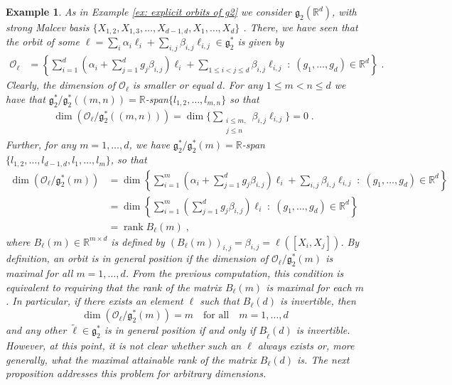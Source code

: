 \documentclass[pdflatex,sn-mathphys-num]{sn-jnl}
\theoremstyle{thmstyletwo}
\theoremstyle{thmstyleone}
\theoremstyle{thmstyletwo}
\newtheorem{example}[definition]{Example}
\newcommand{\fancyg}{\mathfrak{g}}
\newcommand{\R}{\mathbb{R}}
\begin{document}
	\begin{example}\label{ex: general orbits of g2 pt1}
		As in Example \ref{ex: explicit orbits of g2} we consider $\fancyg_2(\R^d)$, with strong Malcev basis $\{X_{1,2}, X_{1,3}, \ldots, X_{d-1,d},X_1, \ldots, X_d\}$ . There, we have seen that the orbit of some $\ell = \sum_i \alpha_i \ell_i + \sum_{i,j} \beta_{i,j} \ell_{i,j} \in \fancyg_2^*$ is given by
		\begin{align*}
			\mathcal{O}_\ell &= \left\{\sum_{i=1}^d(\alpha_i+\sum_{j=1}^dg_{j}\beta_{i,j})\ell_i+\sum_{1\leq i<j\leq d}\beta_{i,j}\ell_{i,j} \;:\; (g_{1}, \ldots, g_d) \in \mathbb{R}^d\right\} \;.
		\end{align*}
		Clearly, the dimension of $\mathcal{O}_\ell$ is smaller or equal $d$. For any $1 \leq m<n\leq d$ we have that $\fancyg_2^*/\fancyg_{2}^*((m, n)) = \R$-span$\{l_{1,2}, \ldots,l_{m,n}\}$ so that
		\begin{align*}
			\dim\left(\mathcal{O}_\ell/\fancyg_{2}^*((m, n))\right)= \dim\Big\{\sum_{\substack{i\leq m,\\j\leq n}}\beta_{i,j}\ell_{i,j}\Big\} = 0 \;. \;
		\end{align*}
		Further, for any $m = 1, \ldots, d$, we have $\fancyg_2^*/\fancyg_{2}^*(m) = \R$-span$\{l_{1,2}, \ldots,l_{d-1,d}, l_1, \ldots, l_m\}$, so that
		\begin{align*}
			\dim\left(\mathcal{O}_\ell/\fancyg_{2}^*(m)\right)&= \dim\left\{\sum_{i=1}^m(\alpha_i+\sum_{j=1}^dg_{j}\beta_{i,j})\ell_i+\sum_{i,j}\beta_{i,j}\ell_{i,j} \;:\; (g_{1}, \ldots, g_d) \in \mathbb{R}^d\right\}\\
			&=\dim\left\{\sum_{i=1}^m\left(\sum_{j=1}^dg_{j}\beta_{i,j}\right)\ell_i \;:\; (g_{1}, \ldots, g_d) \in \mathbb{R}^d\right\}\\
			&=\operatorname{rank} B_\ell(m) \;,
		\end{align*}
		where $B_\ell(m) \in \R^{m\times d}$ is defined by $(B_\ell(m))_{i,j} = \beta_{i,j} = \ell([X_i,X_j])$. By definition, an orbit is in general position if the dimension of $\mathcal{O}_\ell / \mathfrak{g}_2^*(m)$ is maximal for all $m = 1, \ldots, d$. From the previous computation, this condition is equivalent to requiring that the rank of the matrix $B_\ell(m)$ is maximal for each $m$. In particular, if there exists an element $\ell$ such that $B_\ell(d)$ is invertible, then
		\[\dim\left(\mathcal{O}_\ell/\fancyg_{2}^*(m)\right) = m \quad
		\text{for all} \quad m = 1, \ldots, d\]
		and any other $\tilde{\ell} \in \mathfrak{g}_2^*$ is in general position if and only if $B_{\tilde{\ell}}(d)$ is invertible. However, at this point, it is not clear whether such an $\ell$ always exists or, more generally, what the maximal attainable rank of the matrix $B_\ell(d)$ is. The next proposition addresses this problem for arbitrary dimensions.
	\end{example}
\end{document}
